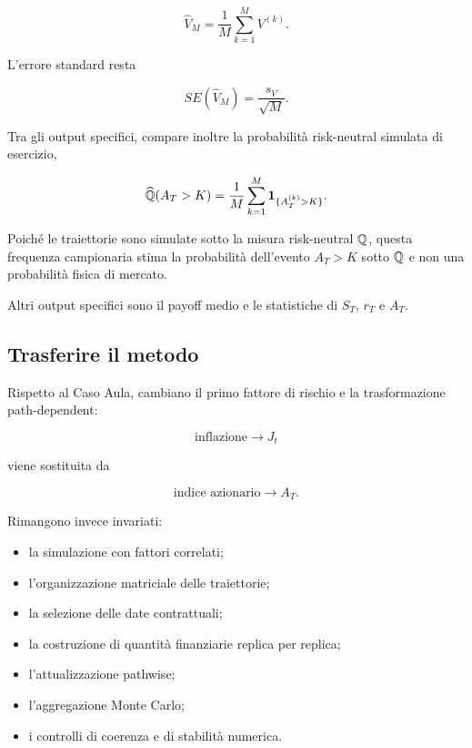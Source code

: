 \[
\widehat V_M
=
\frac{1}{M}
\sum_{k=1}^{M}
V^{(k)}.
\]

L'errore standard resta

\[
SE(\widehat V_M)
=
\frac{s_V}{\sqrt{M}}.
\]

Tra gli output specifici, compare inoltre la probabilit\`a risk-neutral
simulata di esercizio,

\[
\widehat{\mathbb{Q}}(A_T>K)
=
\frac{1}{M}
\sum_{k=1}^{M}
\mathbf{1}_{\{A_T^{(k)}>K\}}.
\]

Poich\'e le traiettorie sono simulate sotto la misura risk-neutral $\mathbb{Q}$,
questa frequenza campionaria stima la probabilit\`a dell'evento
$A_T>K$ sotto $\mathbb{Q}$ e non una probabilit\`a fisica di mercato.

Altri output specifici sono il payoff medio e le statistiche
di $S_T$, $r_T$ e $A_T$.

\subsection{Trasferire il metodo}

Rispetto al Caso Aula, cambiano il primo fattore di rischio e la trasformazione
path-dependent:

\[
\text{inflazione}
\longrightarrow
J_t
\]

\noindent viene sostituita da

\[
\text{indice azionario}
\longrightarrow
A_T.
\]

Rimangono invece invariati:

\begin{itemize}

\item la simulazione con fattori correlati;

\item l'organizzazione matriciale delle traiettorie;

\item la selezione delle date contrattuali;

\item la costruzione di quantit\`a finanziarie replica per replica;

\item l'attualizzazione pathwise;

\item l'aggregazione Monte Carlo;

\item i controlli di coerenza e di stabilit\`a numerica.

\end{itemize}

